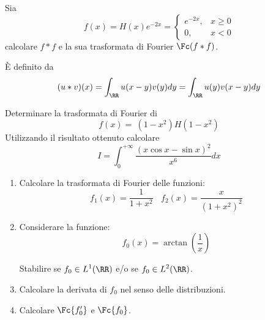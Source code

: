 \ParteEsercizi

\Esercizio{}

Sia
\begin{equation*}
f(x) = H(x) e^{- 2x} =
\begin{cases}
e^{- 2x}, & x \geq 0\\
0, & x < 0
\end{cases}
\end{equation*}
calcolare $\displaystyle f*f$ e la sua trasformata di Fourier $\displaystyle \Fc (f*f)$.
\begin{rem}
 È definito da
\begin{equation*}
(u*v)(x) = \int_{\RR} u(x - y) v(y) dy = \int_{\RR} u(y) v(x - y) dy
\end{equation*}
\end{rem}

\Esercizio{}

Determinare la trasformata di Fourier di
\begin{equation*}
f(x) = \ \left(1 - x^{2}\right) H\left(1 - x^{2}\right)
\end{equation*}
Utilizzando il risultato ottenuto calcolare
\begin{equation*}
I = \int^{+ \infty}_{0}\frac{(x\cos x - \sin x)^{2}}{x^{6}} dx
\end{equation*}

\Esercizio{}

\begin{enumerate}
\item Calcolare la trasformata di Fourier delle funzioni:
\begin{equation*}
f_{1}(x) = \frac{1}{1 + x^{2}} \ \ \ \ f_{2}(x) = \frac{x}{\left(1 + x^{2}\right)^{2}}
\end{equation*}
\item Considerare la funzione:
\begin{equation*}
f_{0}(x) = \arctan\left(\frac{1}{x}\right)
\end{equation*}

Stabilire se $\displaystyle f_{0} \in L^{1}(\RR)$ e/o se $\displaystyle f_{0} \in L^{2}(\RR)$.
\item Calcolare la derivata di $\displaystyle f_{0}$ nel senso delle distribuzioni.
\item Calcolare $\Fc \{f'_{0}\}$ e $\Fc \{f_{0}\}$.
\end{enumerate}

\Esercizio{}

